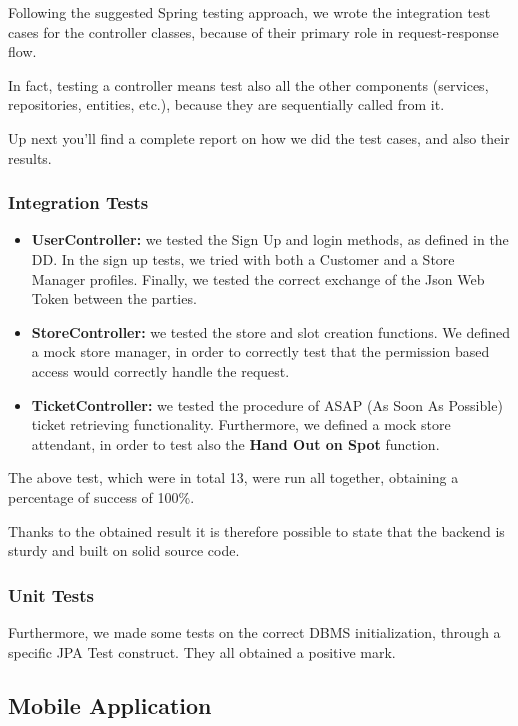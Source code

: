 \documentclass[table, 12pt]{article}
\begin{document}
Following the suggested Spring testing approach, we wrote the integration test cases for the controller classes, because of their primary role in request-response flow.

In fact, testing a controller means test also all the other components (services, repositories, entities, etc.), because they are sequentially called from it.

Up next you'll find a complete report on how we did the test cases, and also their results.

\subsubsection*{Integration Tests}
\begin{itemize}
    \item \textbf{UserController:} we tested the Sign Up and login methods, as defined in the DD. In the sign up tests, we tried with both a Customer and a Store Manager profiles. Finally, we tested the correct exchange of the Json Web Token between the parties.
    \item \textbf{StoreController:} we tested the store and slot creation functions. We defined a mock store manager, in order to correctly test that the permission based access would correctly handle the request.
    \item \textbf{TicketController:} we tested the procedure of ASAP (As Soon As Possible) ticket retrieving functionality. Furthermore, we defined a mock store attendant, in order to test also the \textbf{Hand Out on Spot} function.
\end{itemize}

The above test, which were in total 13, were run all together, obtaining a percentage of success of 100\%.

Thanks to the obtained result it is therefore possible to state that the backend is sturdy and built on solid source code.

\subsubsection*{Unit Tests}
Furthermore, we made some tests on the correct DBMS initialization, through a specific JPA Test construct. They all obtained a positive mark.

\subsection{Mobile Application}
\end{document}
